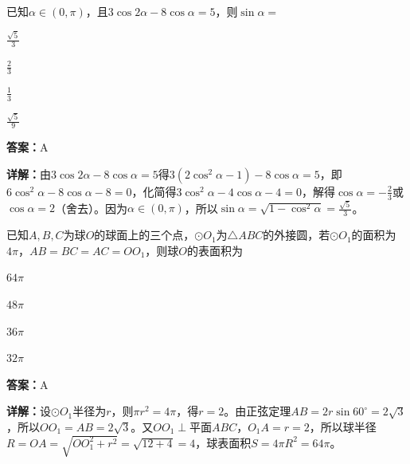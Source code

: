 \begin{question}[points=5]
已知$\alpha\in(0,\pi)$，且$3\cos2\alpha-8\cos\alpha=5$，则$\sin\alpha=$
\begin{choices}
  \item $\frac{\sqrt{5}}{3}$
  \item $\frac{2}{3}$
  \item $\frac{1}{3}$
  \item $\frac{\sqrt{5}}{9}$
\end{choices}
\begin{solution}
\textbf{答案：}A

\textbf{详解：}由$3\cos2\alpha-8\cos\alpha=5$得$3(2\cos^2\alpha-1)-8\cos\alpha=5$，即$6\cos^2\alpha-8\cos\alpha-8=0$，化简得$3\cos^2\alpha-4\cos\alpha-4=0$，解得$\cos\alpha=-\frac{2}{3}$或$\cos\alpha=2$（舍去）。因为$\alpha\in(0,\pi)$，所以$\sin\alpha=\sqrt{1-\cos^2\alpha}=\frac{\sqrt{5}}{3}$。
\end{solution}
\end{question}

\begin{question}[points=5]
已知$A,B,C$为球$O$的球面上的三个点，$\odot O_1$为$\triangle ABC$的外接圆，若$\odot O_1$的面积为$4\pi$，$AB=BC=AC=OO_1$，则球$O$的表面积为
\begin{choices}
  \item $64\pi$
  \item $48\pi$
  \item $36\pi$
  \item $32\pi$
\end{choices}
\begin{solution}
\textbf{答案：}A

\textbf{详解：}设$\odot O_1$半径为$r$，则$\pi r^2=4\pi$，得$r=2$。由正弦定理$AB=2r\sin60^\circ=2\sqrt{3}$，所以$OO_1=AB=2\sqrt{3}$。又$OO_1\perp$平面$ABC$，$O_1A=r=2$，所以球半径$R=OA=\sqrt{OO_1^2+r^2}=\sqrt{12+4}=4$，球表面积$S=4\pi R^2=64\pi$。
\end{solution}
\end{question}


